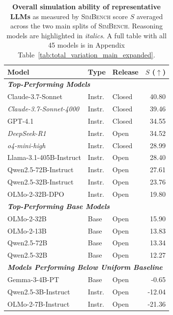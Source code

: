 \documentclass{article} %
\begin{document}
\begin{table}
    \vspace{-0.45cm}
    \caption{
        \textbf{Overall simulation ability of representative LLMs} as measured by \textsc{SimBench} score $S$ averaged across the two main splits of \textsc{SimBench}.
         Reasoning models are highlighted in \textit{italics}. A full table with all 45 models is in Appendix Table~\ref{tab:total_variation_main_expanded}.    
    }
    \label{tab:total_variation_main}
    \renewcommand{\arraystretch}{0.9}
    \setlength{\tabcolsep}{4pt}
    \small
    \centering
    
    \begin{tabular}{lllr}
    \toprule
    \textbf{Model} & \textbf{Type} & \textbf{Release} & \textbf{$S$ ($\uparrow$)} \\
    \midrule
    \multicolumn{4}{l}{\textit{\textbf{Top-Performing Models}}} \\
    \rowcolor{gray!15} 
    Claude-3.7-Sonnet & Instr. & Closed & 40.80 \\
    \textit{Claude-3.7-Sonnet-4000} & Instr. & Closed & 39.46 \\
    \rowcolor{gray!15} 
    GPT-4.1 & Instr. & Closed & 34.55 \\
    \textit{DeepSeek-R1} & Instr. & Open & 34.52 \\
    \rowcolor{gray!15} 
    \textit{o4-mini-high} & Instr. & Closed & 28.99 \\
    Llama-3.1-405B-Instruct & Instr. & Open & 28.40 \\
    \rowcolor[HTML]{EFEFEF}
    Qwen2.5-72B-Instruct & Instr. & Open & 27.61 \\
    Qwen2.5-32B-Instruct & Instr. & Open & 23.76 \\
    \rowcolor{gray!15} 
    OLMo-2-32B-DPO & Instr. & Open & 19.80 \\
    \midrule
    \multicolumn{4}{l}{\textit{\textbf{Top-Performing Base Models}}} \\
    \rowcolor{gray!15} %
    OLMo-2-32B & Base & Open & 15.90 \\
    OLMo-2-13B & Base & Open & 13.83 \\
    \rowcolor{gray!15}
    Qwen2.5-72B & Base & Open & 13.34 \\
    Qwen2.5-32B & Base & Open & 12.27 \\

    \midrule
    \multicolumn{4}{l}{\textit{\textbf{Models Performing Below Uniform Baseline}}} \\    
    \rowcolor{gray!15}
    Gemma-3-4B-PT & Base & Open & -0.65 \\
    Qwen2.5-3B-Instruct & Instr. & Open & -12.04 \\
    \rowcolor{gray!15}
    OLMo-2-7B-Instruct & Instr. & Open & -21.36 \\
    \bottomrule
    \end{tabular}
    \vspace{-2.0cm}
\end{table}
\end{document}
